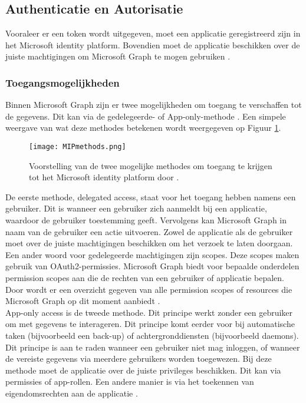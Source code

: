 \subsection{Authenticatie en Autorisatie}


Vooraleer er een token wordt uitgegeven, moet een applicatie geregistreerd zijn in het Microsoft identity platform. Bovendien moet de applicatie beschikken over de juiste machtigingen om Microsoft Graph te mogen gebruiken \autocite{Microsoft2022b}.

\subsubsection{Toegangsmogelijkheden}


Binnen Microsoft Graph zijn er twee mogelijkheden om toegang te verschaffen tot de gegevens. Dit kan via de gedelegeerde- of App-only-methode \autocite{Microsoft2022b}. Een simpele weergave van wat deze methodes betekenen wordt weergegeven op Figuur \ref{MIPM}. \\

\begin{figure}[h]
    \texttt{[image: MIPmethods.png]}
    \caption[Voorbeeld toegangsmogelijkheden]{Voorstelling van de twee mogelijke methodes om toegang te krijgen tot het Microsoft identity platform door \autocite{Microsoft2022b}.}
    \label{MIPM}
\end{figure}

De eerste methode, delegated access, staat voor het toegang hebben namens een gebruiker. Dit is wanneer een gebruiker zich aanmeldt bij een applicatie, waardoor de gebruiker toestemming geeft. Vervolgens kan Microsoft Graph in naam van de gebruiker een actie uitvoeren. Zowel de applicatie als de gebruiker moet over de juiste machtigingen beschikken om het verzoek te laten doorgaan. Een ander woord voor gedelegeerde machtigingen zijn scopes. Deze scopes maken gebruik van OAuth2-permissies. Microsoft Graph biedt voor bepaalde onderdelen permission scopes aan die de rechten van een gebruiker of applicatie bepalen. Door \textcite{Microsoft2023p} wordt er een overzicht gegeven van alle permission scopes of resources die Microsoft Graph op dit moment aanbiedt \autocite{Microsoft2022b}. \\

App-only access is de tweede methode. Dit principe werkt zonder een gebruiker om met gegevens te interageren. Dit principe komt eerder voor bij automatische taken (bijvoorbeeld een back-up) of achtergronddiensten (bijvoorbeeld daemons). Dit principe is aan te raden wanneer een gebruiker niet mag inloggen, of wanneer de vereiste gegevens via meerdere gebruikers worden toegewezen. Bij deze methode moet de applicatie over de juiste privileges beschikken. Dit kan via permissies of app-rollen. Een andere manier is via het toekennen van eigendomsrechten aan de applicatie \autocite{Microsoft2022b}. 

